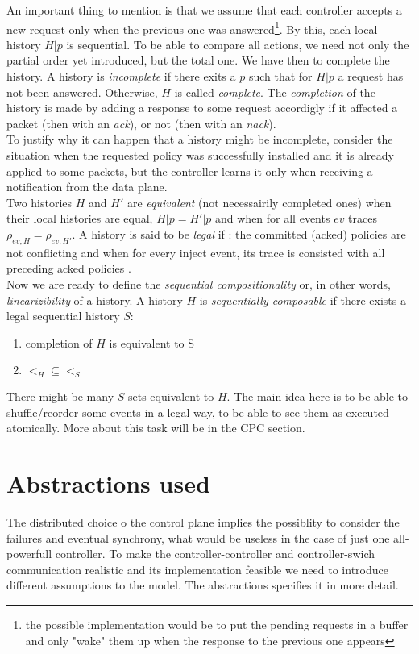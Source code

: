 \documentclass{article}
\begin{document}
An important thing to mention is that we assume that each controller accepts a new request only when the previous one was answered\footnote{the possible implementation would be to put the pending requests in a buffer and only "wake" them up when the response to the previous one appears}. By this, each local history $H|p$ is sequential.
To be able to compare all actions, we need not only the partial order yet introduced, but the total one. We have then to complete the history. A history is \emph{incomplete} if there exits a $p$ such that for $H|p$ a request has not been answered. Otherwise, $H$ is called \emph{complete}. The \emph{completion} of the history is made by adding a response to some request accordigly if it affected a packet (then with an \emph{ack}), or not (then with an \emph{nack}). \\
To justify why it can happen that a history might be incomplete, consider the situation when the requested policy was successfully installed and it is already applied to some packets, but the controller learns it only when receiving a notification from the data plane. \\
Two histories $H$ and $H'$ are \emph{equivalent} (not necessairily completed ones) when their local histories are equal, $H|p=H'|p$ and when for all events $ev$ traces $\rho_{ev,H}=\rho_{ev,H'}$.
A history is said to be \emph{legal} if : the committed (acked) policies are not conflicting and when for every inject event, its trace is consisted with all preceding acked policies \cite{CKLS15}.\\

Now we are ready to define the \emph{sequential compositionality} or, in other words, \emph{linearizibility} of a history. A history $H$ is \emph{sequentially composable} if there exists a legal sequential history $S$:
\begin{enumerate}
\item completion of $H$ is equivalent to S
\item $<_H\subseteq <_S$
\end{enumerate}
There might be many $S$ sets equivalent to $H$. The main idea here is to be able to shuffle/reorder some events in a legal way, to be able to see them as executed atomically. More about this task will be in the CPC section.

\section{Abstractions used}
The distributed choice o the control plane implies the possiblity to consider the failures and eventual synchrony, what would be useless in the case of just one all-powerfull controller. To make the controller-controller and controller-swich communication realistic and its implementation feasible we need to introduce different assumptions to the model. The abstractions specifies it in more detail.
\end{document}
